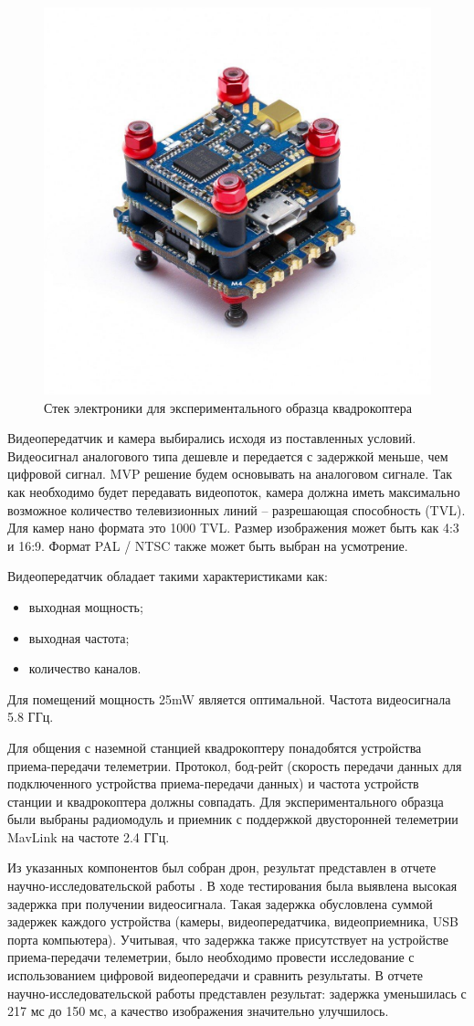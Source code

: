 \begin{figure}[H]
	\centering
	\includegraphics[width=0.5\linewidth]{../RW/pics/stack}
	\caption{Стек электроники для экспериментального образца квадрокоптера
	}
	\label{fig:stack} %
\end{figure}

Видеопередатчик и камера выбирались исходя из поставленных условий. Видеосигнал аналогового типа дешевле и передается с задержкой меньше, чем цифровой сигнал. MVP решение будем основывать на аналоговом сигнале. Так как необходимо будет передавать видеопоток, камера должна иметь максимально возможное количество телевизионных линий -- разрешающая способность (TVL). Для камер нано формата это 1000 TVL. Размер изображения может быть как 4:3 и 16:9. Формат PAL / NTSC также может быть выбран на усмотрение.

Видеопередатчик обладает такими характеристиками как:
\begin{itemize}
	\item выходная мощность;
	\item выходная частота;
	\item количество каналов.
\end{itemize}

Для помещений мощность 25mW является оптимальной. Частота видеосигнала 5.8 ГГц.

Для общения с наземной станцией квадрокоптеру понадобятся устройства приема-передачи телеметрии. Протокол, бод-рейт (скорость передачи данных для подключенного устройства приема-передачи данных) и частота устройств станции и квадрокоптера должны совпадать. Для экспериментального образца были выбраны радиомодуль и приемник с поддержкой двусторонней телеметрии MavLink на частоте 2.4 ГГц.

Из указанных компонентов был собран дрон, результат представлен в отчете научно-исследовательской работы \cite{nir1}. В ходе тестирования была выявлена высокая задержка при получении видеосигнала. Такая задержка обусловлена суммой задержек каждого устройства (камеры, видеопередатчика, видеоприемника, USB порта компьютера). Учитывая, что задержка также присутствует на устройстве приема-передачи телеметрии, было необходимо провести исследование с использованием цифровой видеопередачи и сравнить результаты. В отчете научно-исследовательской работы \cite{nir2} представлен результат: задержка уменьшилась с 217 мс до 150 мс, а качество изображения значительно улучшилось.

